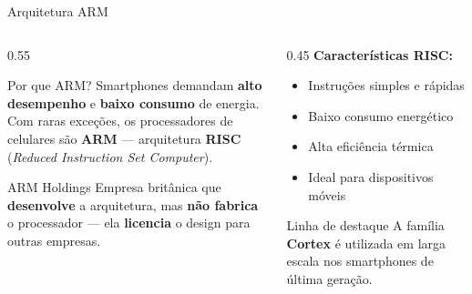 \documentclass[aspectratio=169]{beamer}
\begin{document}
\begin{frame}{Arquitetura ARM}
    \begin{columns}[T]
        \begin{column}{0.55\textwidth}
            \begin{block}{Por que ARM?}
                Smartphones demandam \textbf{alto desempenho} e \textbf{baixo consumo} de energia.\\[0.4em]
                Com raras exceções, os processadores de celulares são \textbf{ARM} — arquitetura \textbf{RISC} (\textit{Reduced Instruction Set Computer}).
            \end{block}
            \vspace{0.4em}
            \begin{exampleblock}{ARM Holdings}
                Empresa britânica que \textbf{desenvolve} a arquitetura, mas \textbf{não fabrica} o processador — ela \textbf{licencia} o design para outras empresas.
            \end{exampleblock}
        \end{column}
        \begin{column}{0.45\textwidth}
            \textbf{Características RISC:}
            \begin{itemize}
                \item Instruções simples e rápidas
                \item Baixo consumo energético
                \item Alta eficiência térmica
                \item Ideal para dispositivos móveis
            \end{itemize}
            \vspace{0.4em}
            \begin{alertblock}{Linha de destaque}
                A família \textbf{Cortex} é utilizada em larga escala nos smartphones de última geração.
            \end{alertblock}
        \end{column}
    \end{columns}
\end{frame}
\end{document}
